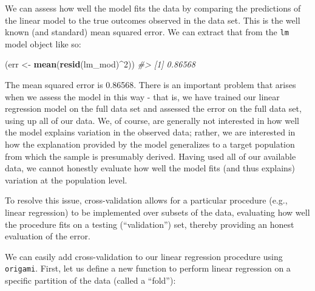 \documentclass[12pt, krantz2,]{krantz}
\newenvironment{Shaded}{\begin{snugshade}}{\end{snugshade}}
\newcommand{\CommentTok}[1]{\textcolor[rgb]{0.37,0.37,0.37}{\textit{#1}}}
\newcommand{\DecValTok}[1]{\textcolor[rgb]{0.06,0.06,0.06}{#1}}
\newcommand{\KeywordTok}[1]{\textcolor[rgb]{0.27,0.27,0.27}{\textbf{#1}}}
\newcommand{\NormalTok}[1]{#1}
\newcommand{\OperatorTok}[1]{\textcolor[rgb]{0.43,0.43,0.43}{\textbf{#1}}}
\newcommand{\StringTok}[1]{\textcolor[rgb]{0.5,0.5,0.5}{#1}}
\theoremstyle{definition}
\theoremstyle{definition}
\theoremstyle{definition}
\newcommand{\1}{\mathbbm{1}}
\begin{document}
We can assess how well the model fits the data by comparing the predictions of
the linear model to the true outcomes observed in the data set. This is the well
known (and standard) mean squared error. We can extract that from the \texttt{lm} model
object like so:

\begin{Shaded}
\begin{Highlighting}[]
\NormalTok{(err <-}\StringTok{ }\KeywordTok{mean}\NormalTok{(}\KeywordTok{resid}\NormalTok{(lm_mod)}\OperatorTok{^}\DecValTok{2}\NormalTok{))}
\CommentTok{#> [1] 0.86568}
\end{Highlighting}
\end{Shaded}

The mean squared error is 0.86568. There is an important problem that arises
when we assess the model in this way - that is, we have trained our linear
regression model on the full data set and assessed the error on the full data
set, using up all of our data. We, of course, are generally not interested in
how well the model explains variation in the observed data; rather, we are
interested in how the explanation provided by the model generalizes to a target
population from which the sample is presumably derived. Having used all of our
available data, we cannot honestly evaluate how well the model fits (and thus
explains) variation at the population level.

To resolve this issue, cross-validation allows for a particular procedure (e.g.,
linear regression) to be implemented over subsets of the data, evaluating how
well the procedure fits on a testing (``validation'') set, thereby providing an
honest evaluation of the error.

We can easily add cross-validation to our linear regression procedure using
\texttt{origami}. First, let us define a new function to perform linear regression on a
specific partition of the data (called a ``fold''):
\end{document}

